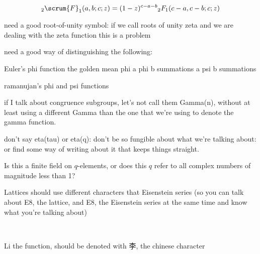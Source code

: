\documentclass[reqno,8pt]{atalart}
\begin{document}
\[
_2\scrum{F}_1 (a,b;c;z) = (1-z)^{c-a-b} {}_2F_1 (c-a, c-b;c ; z)
\]

need a good root-of-unity symbol: if we call roots of unity
        zeta and we are dealing with the zeta function
        this is a problem


need a good way of distinguishing the following:

        Euler's phi function
        the golden mean phi
        a phi b summations
        a psi b summations

        ramanujan's phi and psi functions



if I talk about congruence subgroups, let's not call them Gamma(n), without
at least using a different Gamma than the one that we're using to denote
the gamma function.


don't say eta(tau) or eta(q): don't be so fungible about what we're
talking about: or find some way of writing about it that keeps things
straight.

Is this a finite field on $q$-elements, or does this $q$ refer to
all complex numbers of magnitude less than 1?

Lattices should use different characters that Eisenstein series
(so you can talk about E8, the lattice, and E8, the Eisenstein
series at the same time and know what you're talking about)

~                                                  


Li the function, should be denoted with 李, the chinese character



\begin{bibdiv}
\begin{biblist}





\end{biblist}
\end{bibdiv}
\end{document}
